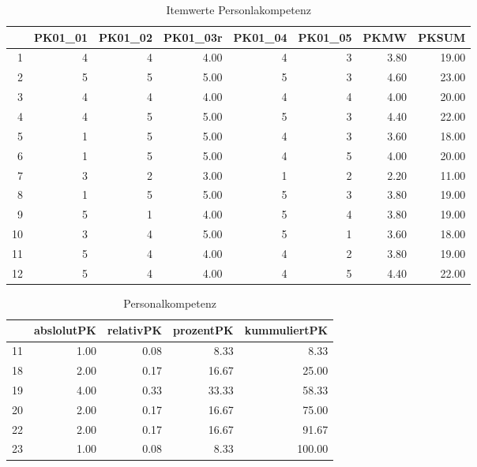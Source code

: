 \begin{table}[ht]
\centering
\caption{Itemwerte Personlakompetenz}
\begin{tabular}{rrrrrrrr}
  \hline
 & PK01\_01 & PK01\_02 & PK01\_03r & PK01\_04 & PK01\_05 & PKMW & PKSUM \\
  \hline
1 &   4 &   4 & 4.00 &   4 &   3 & 3.80 & 19.00 \\
  2 &   5 &   5 & 5.00 &   5 &   3 & 4.60 & 23.00 \\
  3 &   4 &   4 & 4.00 &   4 &   4 & 4.00 & 20.00 \\
  4 &   4 &   5 & 5.00 &   5 &   3 & 4.40 & 22.00 \\
  5 &   1 &   5 & 5.00 &   4 &   3 & 3.60 & 18.00 \\
  6 &   1 &   5 & 5.00 &   4 &   5 & 4.00 & 20.00 \\
  7 &   3 &   2 & 3.00 &   1 &   2 & 2.20 & 11.00 \\
  8 &   1 &   5 & 5.00 &   5 &   3 & 3.80 & 19.00 \\
  9 &   5 &   1 & 4.00 &   5 &   4 & 3.80 & 19.00 \\
  10 &   3 &   4 & 5.00 &   5 &   1 & 3.60 & 18.00 \\
  11 &   5 &   4 & 4.00 &   4 &   2 & 3.80 & 19.00 \\
  12 &   5 &   4 & 4.00 &   4 &   5 & 4.40 & 22.00 \\
   \hline
\end{tabular}
\end{table}

\begin{table}[ht]
\centering
\caption{Personalkompetenz}
\begin{tabular}{rrrrr}
  \hline
 & abslolutPK & relativPK & prozentPK & kummuliertPK \\
  \hline
11 & 1.00 & 0.08 & 8.33 & 8.33 \\
  18 & 2.00 & 0.17 & 16.67 & 25.00 \\
  19 & 4.00 & 0.33 & 33.33 & 58.33 \\
  20 & 2.00 & 0.17 & 16.67 & 75.00 \\
  22 & 2.00 & 0.17 & 16.67 & 91.67 \\
  23 & 1.00 & 0.08 & 8.33 & 100.00 \\
   \hline
\end{tabular}
\end{table}

